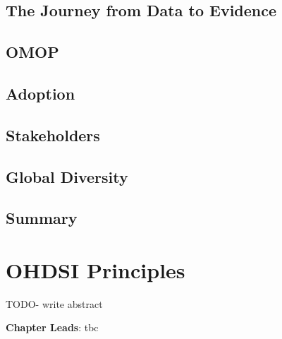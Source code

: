 \documentclass[
  letterpaper,
  paper=7in:10in,
  pagesize=pdftex,
  headinclude=on,
  footinclude=on,
  12pt]{scrbook}
\begin{document}
\section{The Journey from Data to
Evidence}\label{sec-ohdsi-community-journey}

\section{OMOP}\label{sec-ohdsi-community-omop}

\section{Adoption}\label{sec-ohdsi-community-adoption}

\section{Stakeholders}\label{sec-ohdsi-community-stakeholders}

\section{Global Diversity}\label{sec-ohdsi-community-global}

\section{Summary}\label{sec-ohdsi-community-summary}

\chapter{OHDSI Principles}\label{sec-ohdsi-principles}

TODO- write abstract

\hfill\break

\textbf{Chapter Leads}: tbc
\end{document}
